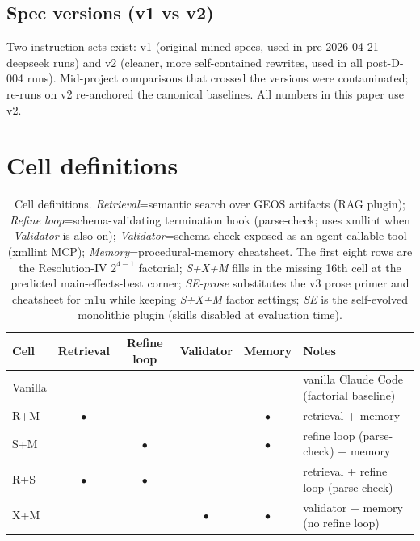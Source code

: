 \documentclass{article}
\begin{document}
\subsection{Spec versions (v1 vs v2)}
Two instruction sets exist: v1 (original mined specs, used in pre-2026-04-21 deepseek runs) and v2 (cleaner, more self-contained rewrites, used in all post-D-004 runs). Mid-project comparisons that crossed the versions were contaminated; re-runs on v2 re-anchored the canonical baselines. All numbers in this paper use v2.

\section{Cell definitions}
\label{app:cells}

\begin{table}[h]
  \caption{Cell definitions. \emph{Retrieval}=semantic search over GEOS artifacts (RAG plugin); \emph{Refine loop}=schema-validating termination hook (parse-check; uses xmllint when \emph{Validator} is also on); \emph{Validator}=schema check exposed as an agent-callable tool (xmllint MCP); \emph{Memory}=procedural-memory cheatsheet. The first eight rows are the Resolution-IV $2^{4-1}$ factorial; \emph{S+X+M} fills in the missing 16th cell at the predicted main-effects-best corner; \emph{SE-prose} substitutes the v3 prose primer and cheatsheet for m1u while keeping \emph{S+X+M} factor settings; \emph{SE} is the self-evolved monolithic plugin (skills disabled at evaluation time).}
  \label{tab:cells}
  \centering
  \small
  \begin{tabular}{lccccl}
    \toprule
    \textbf{Cell} & \textbf{Retrieval} & \textbf{Refine loop} & \textbf{Validator} & \textbf{Memory} & \textbf{Notes} \\
    \midrule
    Vanilla &         &         &         &         & vanilla Claude Code (factorial baseline)               \\
    R+M & $\bullet$ &         &         & $\bullet$ & retrieval + memory                                     \\
    S+M &         & $\bullet$ &         & $\bullet$ & refine loop (parse-check) + memory                     \\
    R+S & $\bullet$ & $\bullet$ &         &         & retrieval + refine loop (parse-check)                  \\
    X+M &         &         & $\bullet$ & $\bullet$ & validator + memory (no refine loop)                    \\

\end{tabular}
\end{table}
\end{document}
